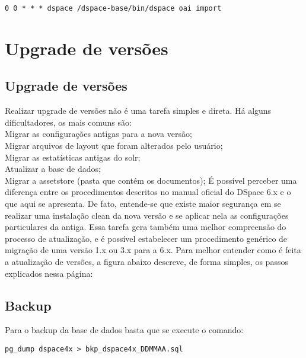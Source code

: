 \documentclass[12pt,hidelinks]{article}
\begin{document}
    \begin{verbatim}
0 0 * * * dspace /dspace-base/bin/dspace oai import
    \end{verbatim}

\newpage

\section{Upgrade de versões}
\newpage
\subsection{Upgrade de versões}
Realizar upgrade de versões não é uma tarefa simples e direta. Há alguns dificultadores, os mais comuns são:\\

\textbullet \hspace{6pt} Migrar as configurações antigas para a nova versão;\\
\textbullet \hspace{6pt} Migrar arquivos de layout que foram alterados pelo usuário;\\
\textbullet \hspace{6pt} Migrar as estatísticas antigas do solr;\\
\textbullet \hspace{6pt} Atualizar a base de dados;\\
\textbullet \hspace{6pt} Migrar a assetstore (pasta que contém os documentos);
\singlespacing
É possível perceber uma diferença entre os procedimentos descritos no manual oficial do DSpace 6.x e o que aqui se apresenta. De fato, entende-se que existe maior segurança em se realizar uma instalação clean da nova versão e se aplicar nela as configurações particulares da antiga. Essa tarefa gera também uma melhor compreensão do processo de atualização, e é possível estabelecer um procedimento genérico de migração de uma versão 1.x ou 3.x para a 6.x.
\singlespacing
Para melhor entender como é feita a atualização de versões, a figura abaixo descreve, de forma simples, os passos explicados nessa página:

\subsection{Backup}\label{cap_BKP}
Para o backup da base de dados basta que se execute o comando:

\begin{verbatim}
pg_dump dspace4x > bkp_dspace4x_DDMMAA.sql
\end{verbatim}
\end{document}
